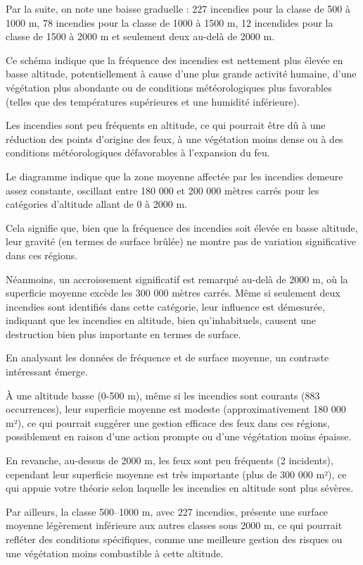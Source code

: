 \documentclass[
]{article}
\begin{document}
Par la suite, on note une baisse graduelle : 227 incendies pour la
classe de 500 à 1000 m, 78 incendies pour la classe de 1000 à 1500 m, 12
incendides pour la classe de 1500 à 2000 m et seulement deux au-delà de
2000 m.

Ce schéma indique que la fréquence des incendies est nettement plus
élevée en basse altitude, potentiellement à cause d'une plus grande
activité humaine, d'une végétation plus abondante ou de conditions
météorologiques plus favorables (telles que des températures supérieures
et une humidité inférieure).

Les incendies sont peu fréquents en altitude, ce qui pourrait être dû à
une réduction des points d'origine des feux, à une végétation moins
dense ou à des conditions météorologiques défavorables à l'expansion du
feu.

Le diagramme indique que la zone moyenne affectée par les incendies
demeure assez constante, oscillant entre 180 000 et 200 000 mètres
carrés pour les catégories d'altitude allant de 0 à 2000 m.

Cela signifie que, bien que la fréquence des incendies soit élevée en
basse altitude, leur gravité (en termes de surface brûlée) ne montre pas
de variation significative dans ces régions.

Néanmoins, un accroissement significatif est remarqué au-delà de 2000 m,
où la superficie moyenne excède les 300 000 mètres carrés. Même si
seulement deux incendies sont identifiés dans cette catégorie, leur
influence est démesurée, indiquant que les incendies en altitude, bien
qu'inhabituels, causent une destruction bien plus importante en termes
de surface.

En analysant les données de fréquence et de surface moyenne, un
contraste intéressant émerge.

À une altitude basse (0-500 m), même si les incendies sont courants (883
occurrences), leur superficie moyenne est modeste (approximativement 180
000 m²), ce qui pourrait suggérer une gestion efficace des feux dans ces
régions, possiblement en raison d'une action prompte ou d'une végétation
moins épaisse.

En revanche, au-dessus de 2000 m, les feux sont peu fréquents (2
incidents), cependant leur superficie moyenne est très importante (plus
de 300 000 m²), ce qui appuie votre théorie selon laquelle les incendies
en altitude sont plus sévères.

Par ailleurs, la classe 500--1000 m, avec 227 incendies, présente une
surface moyenne légèrement inférieure aux autres classes sous 2000 m, ce
qui pourrait refléter des conditions spécifiques, comme une meilleure
gestion des risques ou une végétation moins combustible à cette
altitude.
\end{document}
